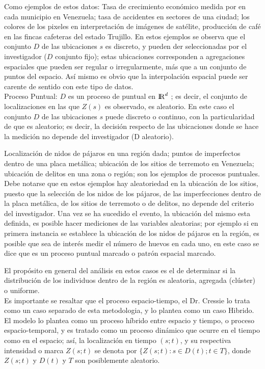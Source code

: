 \documentclass[12pt]{report}
\begin{document}
	Como ejemplos de estos datos: Tasa de crecimiento económico medida por en cada municipio en Venezuela; tasa de accidentes en sectores de una ciudad; los colores de los pixeles en interpretación de imágenes de satélite, producción de café en las fincas cafeteras del estado Trujillo. En estos ejemplos se observa que el conjunto $D$  de las ubicaciones $s$ es discreto, y pueden der seleccionadas por el investigador ($D$ conjunto fijo);  estas ubicaciones  corresponden a agregaciones espaciales que pueden ser regular o irregularmente, más que a un conjunto de puntos del espacio. Así mismo es obvio que la interpolación espacial puede ser carente de sentido con este tipo de datos.\\
	
	
	Proceso Puntual:  $D$ es un proceso de puntual en  $ {\rm I\!R}^{d}$   ; es decir, el conjunto de localizaciones en las que $Z(s)$ es observado, es aleatorio. En este caso el conjunto $D$ de las ubicaciones $s$ puede discreto o continuo, con la particularidad de que es aleatorio; es decir, la decisión respecto de las ubicaciones donde se hace la medición no depende del investigador (D aleatorio).
	
	Localización de nidos de pájaros en una región dada; puntos de imperfectos dentro de una placa metálica; ubicación de los sitios de terremoto en Venezuela; ubicación de delitos en una zona o región; son los ejemplos de procesos puntuales.  Debe notarse que en estos ejemplos hay aleatoriedad en la ubicación  de los sitios, puesto que la selección de los nidos de los pájaros, de las imperfecciones dentro de la placa metálica, de los sitios de terremoto o de delitos, no depende del criterio del investigador.  Una vez se ha sucedido el evento, la ubicación del  mismo esta definida, es posible hacer mediciones de las variables aleatorias; por ejemplo si en primera instancia se establece la ubicación de los nidos de pájaros en la región, es posible que sea de interés medir el número de huevos en cada uno, en este caso se dice que es un  proceso puntual marcado o patrón espacial marcado. 
	
	El propósito en general del análisis en estos casos es el de determinar si la distribución de los individuos dentro de la región es aleatoria, agregada (clúster)  o uniforme.\\
	
	
	
	Es importante se resaltar que el proceso espacio-tiempo, el Dr. Cressie lo trata  como un caso separado de esta metodologia, y lo plantea como un caso Hibrido. El modelo lo plantea como un proceso híbrido entre espacio y tiempo, o proceso espacio-temporal, y  es tratado como un proceso dinámico que ocurre en el tiempo como en el espacio; así, la  localización en tiempo $(s; t)$, y su respectiva intensidad o marca $Z(s; t)$ se denota por $\{ Z(s; t) : s \in D(t); t \in T\}$, donde $Z(s; t)$ y $D(t)$ y $T$ son posiblemente aleatorio. \\
	
\end{document}
